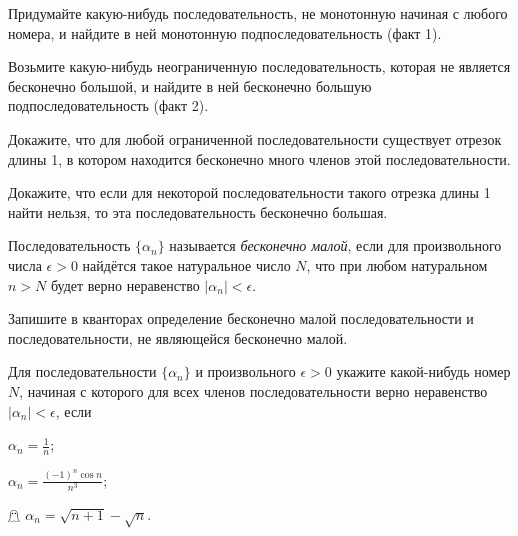 \documentclass[a4paper, 12pt, num=2426, date=01.09.2020]{listok}
\begin{document}
\begin{problem}
\begin{probparts}
    \item Придумайте какую-нибудь последовательность, не монотонную начиная с любого номера, и найдите в ней монотонную подпоследовательность (факт 1).
    \item Возьмите какую-нибудь неограниченную последовательность, которая не является бесконечно большой, и найдите в ней бесконечно большую подпоследовательность (факт 2).
\end{probparts}
\end{problem}

\begin{problem}
\begin{probparts}
    \item Докажите, что для любой ограниченной последовательности существует отрезок длины 1, в котором находится бесконечно много членов этой последовательности.
    \item Докажите, что если для некоторой последовательности такого отрезка длины 1 найти нельзя, то эта последовательность  бесконечно большая.
\end{probparts}
\end{problem}

\begin{definition}
    Последовательность $\{\alpha_n\}$ называется \textit{бесконечно малой}, если для произвольного числа $\epsilon > 0$
    найдётся такое натуральное число $N$, что при любом натуральном $n > N$ будет верно неравенство $|\alpha_n| < \epsilon$.
\end{definition}

\begin{problem}
    Запишите в кванторах определение бесконечно малой последовательности и последовательности, не являющейся бесконечно малой.
\end{problem}

\begin{problem}
    Для последовательности $\{\alpha_n\}$ и произвольного $\epsilon > 0$ укажите какой-нибудь номер $N$, начиная с которого для всех членов последовательности верно неравенство $|\alpha_n| < \epsilon$, если
    \begin{probparts}
        \item $\alpha_n = \frac1n$;
        \item $\alpha_n = \frac{{(-1)}^n \cos n}{n^3}$;
        \item $\mathghost$ $\alpha_n = \sqrt{n + 1} - \sqrt n$.
    \end{probparts}
\end{problem}
\end{document}
